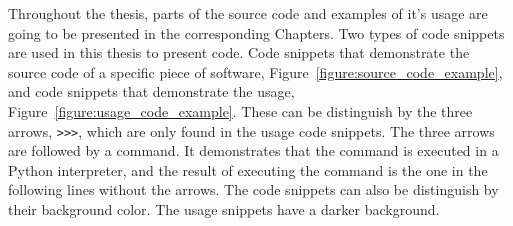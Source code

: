 \begin{table}[htbp]
    \centering
    \caption{Citations and GitHub url for source code and data used in the thesis.}
    \label{table:source_code_data_citations}
\end{table}

Throughout the thesis, parts of the source code and examples of it's usage are
going to be presented in the corresponding Chapters. Two types of code snippets
are used in this thesis to present code. Code snippets that demonstrate the
source code of a specific piece of software, Figure~\ref{figure:source_code_example}, and
code snippets that demonstrate the usage,
Figure~\ref{figure:usage_code_example}. These can be distinguish by the three arrows,
\texttt{>>>}, which are only found in the usage code snippets.
The three arrows are followed by a command. It
demonstrates that the command is executed in a Python interpreter, and the result of executing the command
is the one in the following lines without the arrows.
The code snippets can also be distinguish by their background color. The usage
snippets have a darker background.

